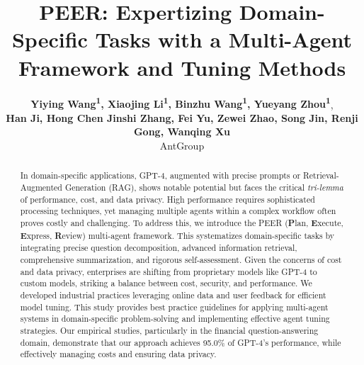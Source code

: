 \documentclass[11pt]{article}
\title{PEER: Expertizing Domain-Specific Tasks with a Multi-Agent Framework and Tuning Methods}
\author{
\small \textbf{Yiying Wang\textsuperscript{1}, Xiaojing Li\textsuperscript{1}, Binzhu Wang\textsuperscript{1}, Yueyang Zhou\textsuperscript{1}}, \\
\small \textbf{Han Ji\textsuperscript{\dag}, Hong Chen Jinshi Zhang, Fei Yu, Zewei Zhao, Song Jin, Renji Gong, Wanqing Xu} \\
\small AntGroup
}
\begin{document}
\maketitle

\renewcommand{\thefootnote}{\fnsymbol{footnote}} 


\begin{abstract}
In domain-specific applications, GPT-4, augmented with precise prompts or Retrieval-Augmented Generation (RAG), shows notable potential but faces the critical \textit{tri-lemma} of performance, cost, and data privacy. High performance requires sophisticated processing techniques, yet managing multiple agents within a complex workflow often proves costly and challenging. To address this, we introduce the PEER (\textbf{P}lan, \textbf{E}xecute, \textbf{E}xpress, \textbf{R}eview) multi-agent framework. This systematizes domain-specific tasks by integrating precise question decomposition, advanced information retrieval, comprehensive summarization, and rigorous self-assessment. Given the concerns of cost and data privacy, enterprises are shifting from proprietary models like GPT-4 to custom models, striking a balance between cost, security, and performance. We developed industrial practices leveraging online data and user feedback for efficient model tuning. This study provides best practice guidelines for applying multi-agent systems in domain-specific problem-solving and implementing effective agent tuning strategies. Our empirical studies, particularly in the financial question-answering domain, demonstrate that our approach achieves 95.0\% of GPT-4’s performance, while effectively managing costs and ensuring data privacy.

\end{abstract}
\end{document}
